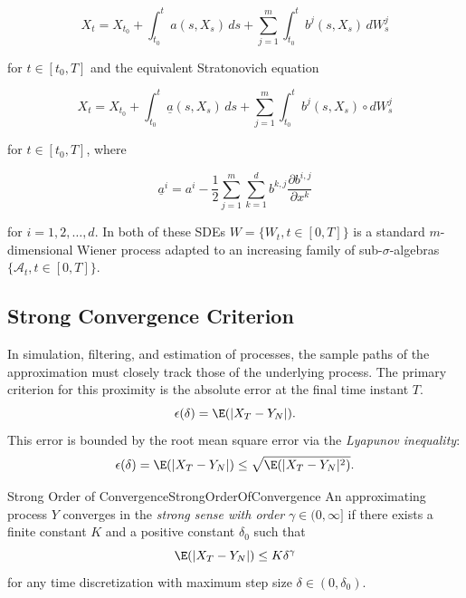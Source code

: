 \begin{equation} \label{eq:MultiDimIto}
    X_t = X_{t_0} + \int_{t_0}^t a(s, X_s) \, ds + \sum_{j=1}^m \int_{t_0}^t b^j(s, X_s) \, dW^j_s
\end{equation}

\noindent for $t \in [t_0, T]$ and the equivalent Stratonovich equation

\begin{equation} \label{eq:MultiDimStratonovich}
    X_t = X_{t_0} + \int_{t_0}^t \underline{a}(s, X_s) \, ds + \sum_{j=1}^m \int_{t_0}^t b^j(s, X_s) \circ dW^j_s
\end{equation}

\noindent for $t \in [t_0, T]$, where

\begin{equation} \label{eq:MultiDimCorrection}
    \underline{a}^i = a^i - \frac{1}{2} \sum_{j=1}^m \sum_{k=1}^d b^{k,j} \frac{\partial b^{i,j}}{\partial x^k}
\end{equation}

\noindent for $i = 1, 2, \dots, d$. In both of these SDEs $W = \{W_t, t \in [0, T]\}$ is a standard $m$-dimensional Wiener process adapted to an increasing family of sub-$\sigma$-algebras $\{\mathcal{A}_t, t \in [0, T]\}$.

\subsection{Strong Convergence Criterion}
In simulation, filtering, and estimation of \Ito{} processes, the sample paths of the approximation must closely track those of the underlying process. The primary criterion for this proximity is the absolute error at the final time instant $T$.
\begin{equation}
    \epsilon(\delta) = \E(|X_T - Y_N|).
    \label{eq:StrongConvergenceError}
\end{equation}
This error is bounded by the root mean square error via the \textit{Lyapunov inequality}:
\begin{equation}
    \epsilon(\delta) = \E(|X_T - Y_N|) \le \sqrt{\E(|X_T - Y_N|^2)}.
    \label{eq:LyapunovBound}
\end{equation}

\begin{defn}{Strong Order of Convergence}{StrongOrderOfConvergence}
An approximating process $Y$ converges in the \textit{strong sense with order} $\gamma \in (0, \infty]$ if there exists a finite constant $K$ and a positive constant $\delta_0$ such that
\begin{equation}
    \E(|X_T - Y_N|) \le K \delta^\gamma
    \label{eq:StrongConvergenceOrder}
\end{equation}
for any time discretization with maximum step size $\delta \in (0, \delta_0)$.
\end{defn}

